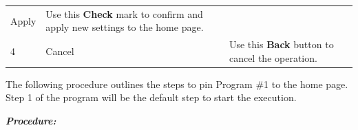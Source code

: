 \begin{longtable}[]{@{}lll@{}}
\begin{minipage}[t]{0.28\columnwidth}
Apply\strut
\end{minipage} & \begin{minipage}[t]{0.46\columnwidth}\raggedright
Use this \textbf{Check} mark to confirm and apply new settings to the
home page.\strut
\end{minipage}\tabularnewline
\begin{minipage}[t]{0.18\columnwidth}\raggedright
4\strut
\end{minipage} & \begin{minipage}[t]{0.28\columnwidth}\raggedright
Cancel\strut
\end{minipage} & \begin{minipage}[t]{0.46\columnwidth}\raggedright
Use this \textbf{Back} button to cancel the operation.\strut
\end{minipage}\tabularnewline
\bottomrule
\end{longtable}

The following procedure outlines the steps to pin Program \#1 to the
home page. Step 1 of the program will be the default step to start the
execution.

\textbf{\emph{Procedure:}}

